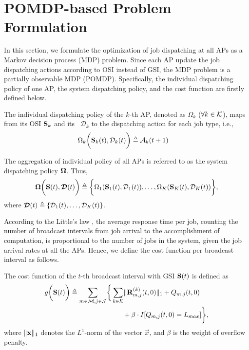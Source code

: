 \section{POMDP-based Problem Formulation}
\label{sec:formulation}
In this section, we formulate the optimization of job dispatching at all APs as a Markov decision process (MDP) problem.
Since each AP update the job dispatching actions according to OSI instead of GSI, the MDP problem is a partially observable MDP (POMDP).
Specifically, the individual dispatching policy of one AP, the system dispatching policy, and the cost function are firstly defined below.

\begin{definition}
    The individual dispatching policy of the $k$-th AP, denoted as $\Omega_{k}$ ($\forall k \in\mathcal{K}$), maps from its OSI $\mathbf{S}_{k}$ and its \brlatency~$\mathcal{D}_{k}$ to the dispatching action for each job type, i.e.,
    {\small
    \begin{align}
        \Omega_{k} \bigg( \mathbf{S}_{k}(t), \mathcal{D}_{k}(t) \bigg)
        &\triangleq \mathcal{A}_{k}(t+1)
        \label{def:action}
    \end{align}
    }%

    The aggregation of individual policy of all APs is referred to as the system dispatching policy $\boldsymbol{\Omega}$.
    Thus,
    {\small
    \begin{align}
        \boldsymbol{\Omega}\bigg( \mathbf{S}(t), \boldsymbol{\mathcal{D}}(t) \bigg) \triangleq \bigg\{
            \Omega_{1}(\mathbf{S}_{1}(t), \mathcal{D}_{1}(t)), \dots, \Omega_{K}(\mathbf{S}_{K}(t),\mathcal{D}_{K}(t))
        \bigg\},
    \end{align}
    }%
    where $\boldsymbol{\mathcal{D}}(t) \triangleq \{ \mathcal{D}_{1}(t), \dots, \mathcal{D}_{K}(t) \}$.
\end{definition}

According to the Little's law \cite{Little1961}, the average response time per job, counting the number of broadcast intervals from job arrival to the accomplishment of computation, is proportional to the number of jobs in the system, given the job arrival rates at all the APs.
Hence, we define the cost function per broadcast interval as follows.

\begin{definition}
    The cost function of the $t$-th broadcast interval with GSI $\mathbf{S}(t)$ is defined as
    {\small
    \begin{align}
        g\Paren{\Stat(t)} \define
            \sum_{m\in\esSet,j\in\jSpace}
            \Brace{&
                \sum_{k\in\apSet} \Inorm{\vec{R}^{(k)}_{m,j}(t,0)} + Q_{m,j}(t,0)
                \nonumber\\
                &~~~~~+ \beta \cdot I[Q_{m,j}(t,0)=L_{max}]
            },
    \end{align}
    }%
    where $\lVert\mathbf{x}\|_1$ denotes the $L^1$-norm of the vector $\vec{x}$, and $\beta$ is the weight of overflow penalty.
\end{definition}

